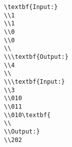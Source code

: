 \begin{verbatim}
\textbf{Input:}
\\1
\\1
\\0
\\0
\\
\\\textbf{Output:}
\\4
\\
\\\textbf{Input:}
\\3
\\010
\\011
\\010\textbf{
\\
\\Output:}
\\202\end{verbatim}